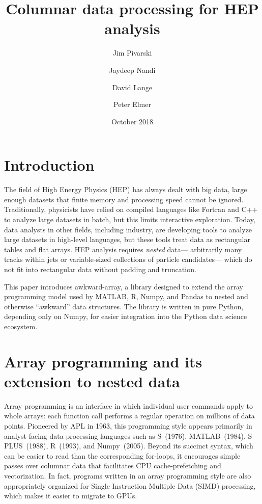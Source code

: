 \documentclass{webofc}
\title{Columnar data processing for HEP analysis}
\author{Jim Pivarski\inst{1} \and Jaydeep Nandi\inst{2} \and David Lange\inst{1} \and Peter Elmer\inst{1}}
\date{October 2018}
\begin{document}

\maketitle

\section{Introduction}

The field of High Energy Physics (HEP) has always dealt with big data, large enough datasets that finite memory and processing speed cannot be ignored. Traditionally, physicists have relied on compiled languages like Fortran and C++ to analyze large datasets in batch, but this limits interactive exploration. Today, data analysts in other fields, including industry, are developing tools to analyze large datasets in high-level languages, but these tools treat data as rectangular tables and flat arrays. HEP analysis requires {\it nested} data--- arbitrarily many tracks within jets or variable-sized collections of particle candidates--- which do not fit into rectangular data without padding and truncation.

This paper introduces awkward-array, a library designed to extend the array programming model used by MATLAB, R, Numpy, and Pandas to nested and otherwise ``awkward'' data structures. The library is written in pure Python, depending only on Numpy, for easier integration into the Python data science ecosystem.

\section{Array programming and its extension to nested data}

Array programming is an interface in which individual user commands apply to whole arrays: each function call performs a regular operation on millions of data points. Pioneered by APL in 1963, this programming style appears primarily in analyst-facing data processing languages such as S~(1976), MATLAB~(1984), S-PLUS~(1988), R~(1993), and Numpy~(2005). Beyond its succinct syntax, which can be easier to read than the corresponding for-loops, it encourages simple passes over columnar data that facilitates CPU cache-prefetching and vectorization. In fact, programs written in an array programming style are also appropriately organized for Single Instruction Multiple Data (SIMD) processing, which makes it easier to migrate to GPUs.
\end{document}
